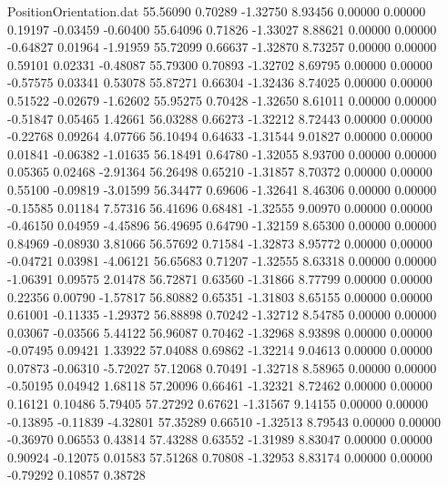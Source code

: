 \begin{filecontents}{PositionOrientation.dat}
  55.56090    0.70289   -1.32750     8.93456    0.00000    0.00000    0.19197   -0.03459   -0.60400
  55.64096    0.71826   -1.33027     8.88621    0.00000    0.00000   -0.64827    0.01964   -1.91959
  55.72099    0.66637   -1.32870     8.73257    0.00000    0.00000    0.59101    0.02331   -0.48087
  55.79300    0.70893   -1.32702     8.69795    0.00000    0.00000   -0.57575    0.03341    0.53078
  55.87271    0.66304   -1.32436     8.74025    0.00000    0.00000    0.51522   -0.02679   -1.62602
  55.95275    0.70428   -1.32650     8.61011    0.00000    0.00000   -0.51847    0.05465    1.42661
  56.03288    0.66273   -1.32212     8.72443    0.00000    0.00000   -0.22768    0.09264    4.07766
  56.10494    0.64633   -1.31544     9.01827    0.00000    0.00000    0.01841   -0.06382   -1.01635
  56.18491    0.64780   -1.32055     8.93700    0.00000    0.00000    0.05365    0.02468   -2.91364
  56.26498    0.65210   -1.31857     8.70372    0.00000    0.00000    0.55100   -0.09819   -3.01599
  56.34477    0.69606   -1.32641     8.46306    0.00000    0.00000   -0.15585    0.01184    7.57316
  56.41696    0.68481   -1.32555     9.00970    0.00000    0.00000   -0.46150    0.04959   -4.45896
  56.49695    0.64790   -1.32159     8.65300    0.00000    0.00000    0.84969   -0.08930    3.81066
  56.57692    0.71584   -1.32873     8.95772    0.00000    0.00000   -0.04721    0.03981   -4.06121
  56.65683    0.71207   -1.32555     8.63318    0.00000    0.00000   -1.06391    0.09575    2.01478
  56.72871    0.63560   -1.31866     8.77799    0.00000    0.00000    0.22356    0.00790   -1.57817
  56.80882    0.65351   -1.31803     8.65155    0.00000    0.00000    0.61001   -0.11335   -1.29372
  56.88898    0.70242   -1.32712     8.54785    0.00000    0.00000    0.03067   -0.03566    5.44122
  56.96087    0.70462   -1.32968     8.93898    0.00000    0.00000   -0.07495    0.09421    1.33922
  57.04088    0.69862   -1.32214     9.04613    0.00000    0.00000    0.07873   -0.06310   -5.72027
  57.12068    0.70491   -1.32718     8.58965    0.00000    0.00000   -0.50195    0.04942    1.68118
  57.20096    0.66461   -1.32321     8.72462    0.00000    0.00000    0.16121    0.10486    5.79405
  57.27292    0.67621   -1.31567     9.14155    0.00000    0.00000   -0.13895   -0.11839   -4.32801
  57.35289    0.66510   -1.32513     8.79543    0.00000    0.00000   -0.36970    0.06553    0.43814
  57.43288    0.63552   -1.31989     8.83047    0.00000    0.00000    0.90924   -0.12075    0.01583
  57.51268    0.70808   -1.32953     8.83174    0.00000    0.00000   -0.79292    0.10857    0.38728

\end{filecontents}
